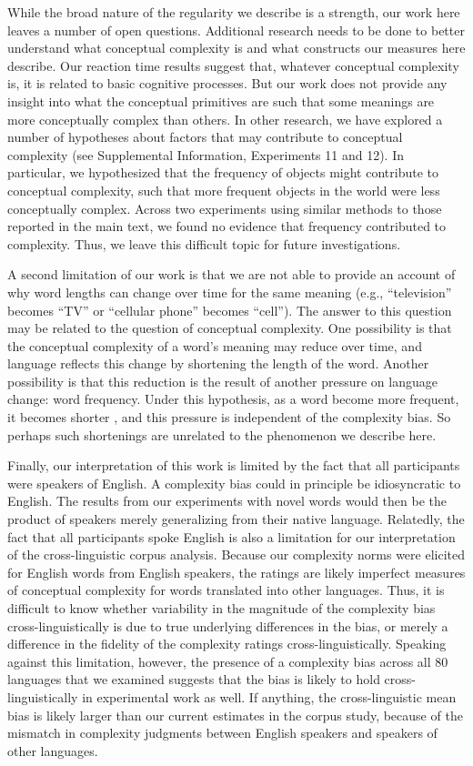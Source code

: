 \documentclass[man]{apa2}
\begin{document}
While the broad nature of the regularity we describe is a strength, our work here leaves a number of open questions. Additional research needs to be done to better understand what conceptual complexity is and what constructs our measures here describe. Our reaction time results suggest that, whatever conceptual complexity is, it is related to basic cognitive processes. But our work does not provide any insight into what the conceptual primitives are such that some meanings are more conceptually complex than others. In other research, we have explored a number of hypotheses about factors that may contribute to conceptual complexity (see Supplemental Information, Experiments 11 and 12). In particular, we hypothesized that the frequency of objects might contribute to conceptual complexity, such that more frequent objects in the world were less conceptually complex. Across two experiments using similar methods to those reported in the main text, we found no evidence that frequency contributed to complexity. Thus, we leave this difficult topic for future investigations. 

A second limitation of our work is that we are not able to provide an account of why word lengths can change over time for the same meaning (e.g., ``television'' becomes ``TV'' or ``cellular phone'' becomes ``cell''). The answer to this question may be related to the question of conceptual complexity. One possibility is that the conceptual complexity of a word's meaning may reduce over time, and language reflects this change by shortening the length of the word. Another possibility is that this reduction is the result of another pressure on language change: word frequency. Under this hypothesis, as a word become more frequent, it becomes shorter \cite{zipf1936}, and this pressure is independent of the complexity bias. So perhaps such shortenings are unrelated to the phenomenon we describe here. 

Finally, our interpretation of this work is limited by the fact that all participants were speakers of English. A complexity bias could in principle be idiosyncratic to English. The results from our experiments with novel words would then be the product of speakers merely generalizing from their native language. Relatedly, the fact that all participants spoke English is also a limitation for our interpretation of the cross-linguistic corpus analysis. Because our complexity norms were elicited for English words from English speakers, the ratings are likely imperfect measures of conceptual complexity for words translated into other languages. Thus, it is difficult to know whether variability in the magnitude of the complexity bias cross-linguistically is due to true underlying differences in the bias, or merely a difference in the fidelity of the complexity ratings cross-linguistically. Speaking against this limitation, however, the presence of a complexity bias across all 80 languages that we examined suggests that the bias is likely to hold cross-linguistically in experimental work as well. If anything, the cross-linguistic mean bias is likely larger than our current estimates in the corpus study, because of the mismatch in complexity judgments between English speakers and speakers of other languages.
\end{document}
